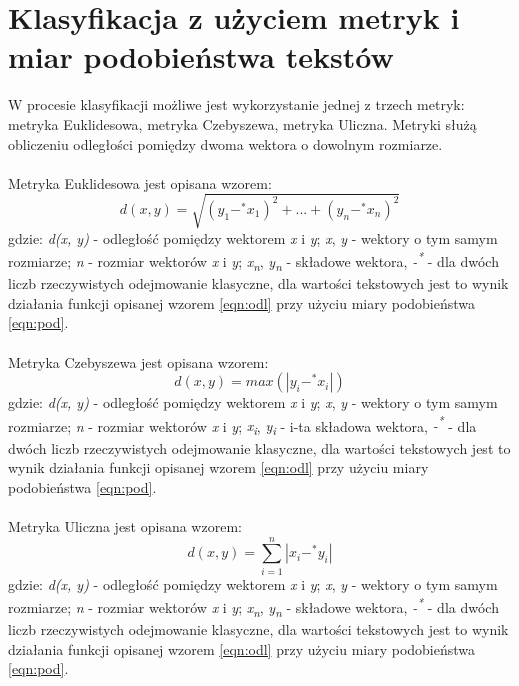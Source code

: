 \documentclass{classrep}
\begin{document}
\section{Klasyfikacja z użyciem metryk i miar podobieństwa tekstów}

W procesie klasyfikacji możliwe jest wykorzystanie jednej z trzech metryk: metryka Euklidesowa, metryka Czebyszewa, metryka Uliczna. Metryki służą obliczeniu odległości pomiędzy dwoma wektora o dowolnym rozmiarze.\\\\ Metryka Euklidesowa\cite{dane} jest opisana wzorem: 
\begin{equation} d(x, y) = \sqrt{(y_1 -^* x_1)^2 + ... + (y_n -^* x_n)^2}  \end{equation}
gdzie: \textit{d(x, y)} - odległość pomiędzy wektorem \textit{x} i \textit{y}; \textit{x}, \textit{y} - wektory o tym samym rozmiarze; \textit{n} - rozmiar wektorów \textit{x} i \textit{y};  \textit{x\textsubscript{n}}, \textit{y\textsubscript{n}} - składowe wektora, \textit{-\textsuperscript{*}} - dla dwóch liczb rzeczywistych odejmowanie klasyczne,  dla wartości tekstowych jest to wynik działania funkcji opisanej wzorem \ref{eqn:odl} przy użyciu miary podobieństwa \ref{eqn:pod}.
\\\\
Metryka Czebyszewa\cite{dane} jest opisana wzorem: 
\begin{equation} d(x, y) = max(|y_i -^* x_i|) \end{equation}
gdzie:  \textit{d(x, y)} - odległość pomiędzy wektorem  \textit{x} i \textit{y}; \textit{x}, \textit{y} - wektory o tym samym rozmiarze; \textit{n} - rozmiar wektorów \textit{x} i \textit{y};   \textit{x\textsubscript{i}},  \textit{y\textsubscript{i}} - i-ta składowa wektora, \textit{-\textsuperscript{*}} - dla dwóch liczb rzeczywistych odejmowanie klasyczne,  dla wartości tekstowych jest to wynik działania funkcji opisanej wzorem \ref{eqn:odl} przy użyciu miary podobieństwa \ref{eqn:pod}.
\\\\
Metryka Uliczna\cite{dane} jest opisana wzorem: 
\begin{equation} d(x, y) = \sum_{i = 1}^{n} |x_i -^* y_i| \end{equation}
gdzie: \textit{d(x, y)} - odległość pomiędzy wektorem \textit{x} i \textit{y}; \textit{x}, \textit{y} - wektory o tym samym rozmiarze; \textit{n} - rozmiar wektorów \textit{x} i \textit{y};  \textit{x\textsubscript{n}}, \textit{y\textsubscript{n}} - składowe wektora, \textit{-\textsuperscript{*}} - dla dwóch liczb rzeczywistych odejmowanie klasyczne,  dla wartości tekstowych jest to wynik działania funkcji opisanej wzorem \ref{eqn:odl} przy użyciu miary podobieństwa \ref{eqn:pod}.
\end{document}
